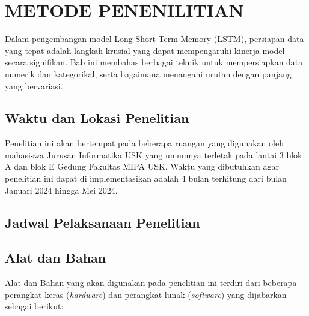 \chapter{METODE PENENILITIAN}

\par Dalam pengembangan model Long Short-Term Memory (LSTM), persiapan data yang tepat adalah langkah krusial yang dapat mempengaruhi kinerja model secara signifikan. Bab ini membahas berbagai teknik untuk mempersiapkan data numerik dan kategorikal, serta bagaimana menangani urutan dengan panjang yang bervariasi.

\section{Waktu dan Lokasi Penelitian}
Penelitian ini akan bertempat pada beberapa ruangan yang digunakan oleh mahasiswa Jurusan Informatika USK yang umumnya terletak pada lantai 3 blok A dan blok E Gedung Fakultas MIPA USK. Waktu yang dibutuhkan agar penelitian ini dapat di implementasikan adalah 4 bulan terhitung dari bulan Januari 2024 hingga Mei 2024.
\section{Jadwal Pelaksanaan Penelitian}

\section{Alat dan Bahan}
Alat dan Bahan yang akan digunakan pada penelitian ini terdiri dari beberapa perangkat keras (\textit{hardware}) dan perangkat lunak (\textit{software}) yang dijabarkan sebagai berikut:

